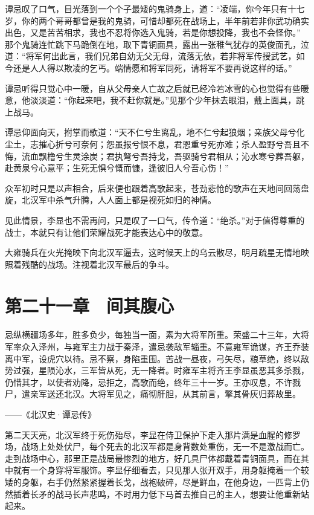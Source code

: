 谭忌叹了口气，目光落到一个个子最矮的鬼骑身上，道：“凌端，你今年只有十七岁，你的两个哥哥都曾是我的鬼骑，可惜却都死在战场上，半年前若非你武功确实出色，又是苦苦相求，我也不忍将你选入鬼骑，若是你想投降，我也不会怪你。” 那个鬼骑连忙跳下马跪倒在地，取下青铜面具，露出一张稚气犹存的英俊面孔，泣道：“将军何出此言，我们兄弟自幼无父无母，流落无依，若非将军传授武艺，如今还是人人得以欺凌的乞丐。端情愿和将军同死，请将军不要再说这样的话。”

谭忌听得只觉心中一暖，自从父母亲人亡故之后就已经冷若冰雪的心也觉得有些暖意，他淡淡道：“你起来吧，我不赶你就是。”见那个少年抹去眼泪，戴上面具，跳上战马。

谭忌仰面向天，拊掌而歌道：“天不仁兮生离乱，地不仁兮起狼烟；亲族父母兮化尘土，志摧心折兮可奈何；怨虽报兮恨不息，君恩重兮死亦难；杀人盈野兮吾且不悔，流血飘橹兮生灵涂炭；君执弩兮吾持戈，吾驱骑兮君相从；沁水寒兮葬吾躯，赴黄泉兮心意平；生死无惧兮慨而慷，逢彼旧人兮吾心伤！”

众军初时只是以声相合，后来便也跟着高歌起来，苍劲悲怆的歌声在天地间回荡盘旋，北汉军中杀气升腾，人人面上都是视死如归的神情。

见此情景，李显也不需再问，只是叹了一口气，传令道：“绝杀。”对于值得尊重的战士，本就只有让他们荣耀战死才能表达心中的敬意。

大雍骑兵在火光掩映下向北汉军逼去，这时候天上的乌云散尽，明月疏星无情地映照着残酷的战场。注视着北汉军最后的争斗。

\chapter{第二十一章　间其腹心}

忌纵横疆场多年，胜多负少，每独当一面，素为大将军所重。荣盛二十三年，大将军率众入泽州，与雍军主力战于秦泽，遣忌袭敌军辎重。不意雍军诡谋，齐王乔装离中军，设虎穴以待。忌不察，身陷重围。苦战一昼夜，弓矢尽，粮草绝，终以敌势过强，星陨沁水，三军皆从死，无一降者。时雍军主将齐王李显虽恶其多杀戮，仍惜其才，以使者劝降，忌拒之，高歌而绝，终年三十一岁。王亦叹息，不许戮尸，遣亲军送还北汉。大将军见之，痛彻肝胆，从其前言，擎其骨灰归葬故里。

——《北汉史·谭忌传》

第二天天亮，北汉军终于死伤殆尽，李显在侍卫保护下走入那片满是血腥的修罗场，战场上处处伏尸，每个死去的北汉军都是身背数处重伤，无一不是激战而亡。走到战场中心，那里正是战局最惨烈的地方，好几具尸体都戴着青铜面具，而在其中就有一个身穿将军服饰。李显仔细看去，只见那人张开双手，用身躯掩着一个较矮的身躯，右手仍然紧紧握着长戈，战袍破碎，尽是鲜血，在他身边，一匹背上仍然插着长矛的战马长声悲鸣，不时用力低下马首去推自己的主人，想要让他重新站起来。

